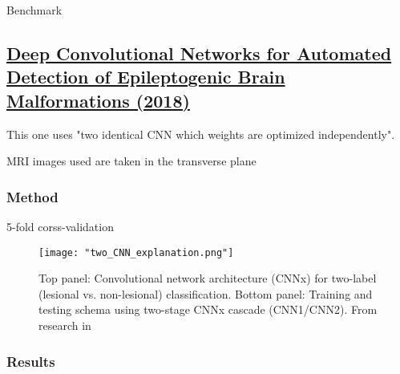 \begin{table}[htbp]
	\centering
	\caption{Benchmark}

	\caption{Results from: }
	\label{tab:res4}
\end{table}

\subsection{\href{https://link.springer.com/chapter/10.1007/978-3-030-00931-1_56}{Deep Convolutional Networks for Automated Detection of Epileptogenic Brain Malformations (2018)}}
\label{sub:sec:res5}

This one uses "two identical CNN which weights are optimized independently".

MRI images used are taken in the transverse plane

\subsubsection{Method}

5-fold corss-validation

\begin{figure}[htbp]
	\centering
	\texttt{[image: "two\_CNN\_explanation.png"]}
	\caption{Top panel: Convolutional network architecture (CNNx) for two-label (lesional vs. non-lesional) classification. Bottom panel: Training and testing schema using two-stage CNNx cascade (CNN1/CNN2). From research in }
\end{figure}

\subsubsection{Results}


